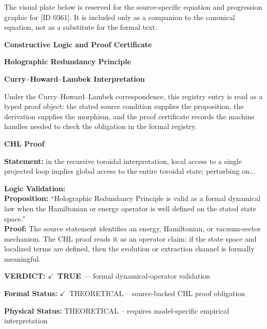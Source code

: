 \begingroup\footnotesize\sloppy
The visual plate below is reserved for the source-specific equation and progression graphic for [ID 0361]. It is included only as a companion to the canonical equation, not as a substitute for the formal text.
\par\endgroup
\ifTZPDarkEdition
{}
\fi

\clearpage
\begingroup\tzpsupportsetup
\noindent\textbf{\fontsize{10.8pt}{12.8pt}\selectfont [ID 0361] Constructive Logic and Proof Certificate}\par
\noindent\textbf{\fontsize{10pt}{12pt}\selectfont Holographic Redundancy Principle}\par
\vspace{0.45em}
\begingroup
\footnotesize
\setlength{\parskip}{0.22em}
\setlength{\parindent}{0pt}
\noindent\textbf{Curry--Howard--Lambek Interpretation}\par
Under the Curry--Howard--Lambek correspondence, this registry entry is read as a typed proof
object: the stated source condition supplies the proposition, the derivation supplies the
morphism, and the proof certificate records the machine handles needed to check the obligation
in the formal registry.

\vspace{0.45em}
\noindent\textbf{CHL Proof}\par
\textbf{Statement:} in the recursive toroidal interpretation, local access to a single projected loop
implies global access to the entire toroidal state; perturbing on...

\textbf{Logic Validation:}\\
\textbf{Proposition:} ``Holographic Redundancy Principle is valid as a formal dynamical law when the Hamiltonian
or energy operator is well defined on the stated state space.''\\
\textbf{Proof:} The source statement identifies an energy, Hamiltonian, or vacuum-sector mechanism. The
CHL proof reads it as an operator claim: if the state space and localized terms are
defined, then the evolution or extraction channel is formally meaningful.

\textbf{VERDICT:} \ensuremath{\checkmark}\ \textbf{TRUE} --- formal dynamical-operator validation

\textbf{Formal Status:} \ensuremath{\checkmark}\ THEORETICAL -- source-backed CHL proof obligation

\textbf{Physical Status:} THEORETICAL -- requires model-specific empirical interpretation
\par\vspace{0.45em}
\par
\ifTZPDarkEdition
{}
\fi
\endgroup
\endgroup
